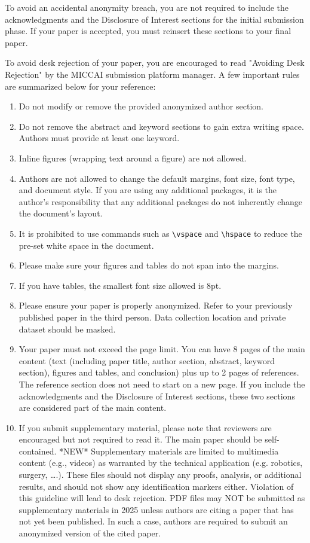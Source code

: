 \documentclass[runningheads]{llncs}
\begin{document}
To avoid an accidental anonymity breach, you are not required to include the acknowledgments and the Disclosure of Interest sections for the initial submission phase.  If your paper is accepted, you must reinsert these sections to your final paper. 

To avoid desk rejection of your paper, you are encouraged to read "Avoiding Desk Rejection" by the MICCAI submission platform manager.  A few important rules are summarized below for your reference:  
\begin{enumerate}
    \item Do not modify or remove the provided anonymized author section.
    \item Do not remove the abstract and keyword sections to gain extra writing space. Authors must provide at least one keyword.
    \item Inline figures (wrapping text around a figure) are not allowed.
    \item Authors are not allowed to change the default margins, font size, font type, and document style.  If you are using any additional packages, it is the author's responsibility that any additional packages do not inherently change the document's layout.
    \item It is prohibited to use commands such as \verb|\vspace| and \verb|\hspace| to reduce the pre-set white space in the document.
    \item Please make sure your figures and tables do not span into the margins.
    \item If you have tables, the smallest font size allowed is 8pt.
    \item Please ensure your paper is properly anonymized.  Refer to your previously published paper in the third person.  Data collection location and private dataset should be masked.
    \item Your paper must not exceed the page limit.  You can have 8 pages of the main content (text (including paper title, author section, abstract, keyword section), figures and tables, and conclusion) plus up to 2 pages of references.  The reference section does not need to start on a new page.  If you include the acknowledgments and the Disclosure of Interest sections, these two sections are considered part of the main content.
    \item If you submit supplementary material, please note that reviewers are encouraged but not required to read it.  The main paper should be self-contained.  *NEW* Supplementary materials are limited to multimedia content (e.g., videos) as warranted by the technical application (e.g. robotics, surgery, ….). These files should not display any proofs, analysis, or additional results, and should not show any identification markers either. Violation of this guideline will lead to desk rejection. PDF files may NOT be submitted as supplementary materials in 2025 unless authors are citing a paper that has not yet been published.  In such a case, authors are required to submit an anonymized version of the cited paper.
\end{enumerate}
\end{document}
